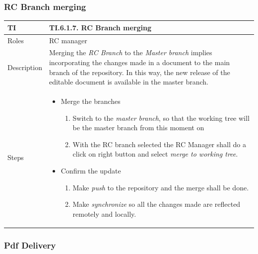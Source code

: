 \documentclass{template/openetcs_article}
\begin{document}
\subsubsection{RC Branch merging}

\begin{flushleft}
\tablefirsthead{}
\tablehead{}
\tabletail{}
\tablelasttail{}
\begin{supertabular}{|m{2cm}|m{13cm}|}
\hline
{}
TI & 
TI.6.1.7. RC Branch merging
\\\hline
Roles &
RC manager
\\\hline
Description &
Merging the {\it RC Branch} to the {\it Master branch} implies incorporating the changes made in a document to the main branch of the repository. In this way, the new release of the editable document is available in the master branch.
\\\hline
Steps &
\begin{itemize}
\item Merge the branches 
\begin{enumerate}
\item Switch to the {\it master branch}, so that the working tree will be the master branch from this moment on
\item With the RC branch selected the RC Manager shall do a click on right button and select {\it merge to working tree}.
\end{enumerate}
\item Confirm the update
\begin{enumerate}
\item Make {\it push} to the repository and the merge shall be done.
\item Make {\it synchronize} so all the changes made are reflected remotely and locally.
\end{enumerate}
\end{itemize}
\\\hline
\end{supertabular}
\end{flushleft}

\subsubsection{Pdf Delivery}
\end{document}
